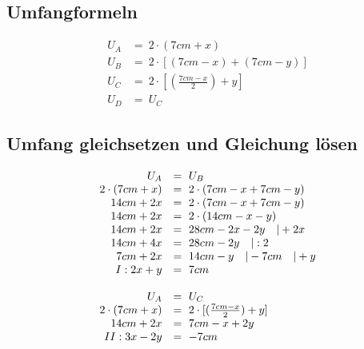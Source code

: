 \documentclass[a4paper, 11pt, ngerman, twocolumn]{article}
\begin{document}
\begin{center}
		\end{center}
		
	   \subsection{Umfangformeln}
	    
		\begin{equation*}
		\begin{array}{rl}
			U_A &=\ 2 \cdot (7cm + x) \\ 
			U_B &=\ 2 \cdot [(7cm - x) + (7cm-y)] \\
			U_C &=\ 2 \cdot [(\frac{7cm - x}{2}) + y] \\
			U_D &=\ U_C
		\end{array}
		\end{equation*}
		
		\subsection{Umfang gleichsetzen und Gleichung lösen}
		\begin{equation*}
		\begin{array}{rl}
			U_A &=\ U_B \\
			2 \cdot (7cm + x) &=\ 2 \cdot (7cm - x + 7cm - y)\\
			14cm + 2x &=\ 2 \cdot (7cm - x + 7cm - y)\\ 
			14cm + 2x &=\ 2 \cdot (14cm - x - y) \\
			14cm + 2x &=\ 28cm - 2x - 2y \quad \text{\textbar} +2x\\
			14cm + 4x &=\ 28cm - 2y \quad \text{\textbar} :2\\
			7cm + 2x &=\ 14cm - y \quad \text{\textbar} -7cm \quad \text{\textbar} +y \\
			I: 2x + y &=\ 7cm\\
			\\
			U_A &=\ U_C \\
			2 \cdot (7cm + x) &=\ 2 \cdot [(\frac{7cm - x}{2}) + y] \\
			14cm + 2x &=\ 7cm - x + 2y\\
			II: 3x - 2y &=\ -7cm \\	
			\end{array}
			\end{equation*}
		
\end{document}
